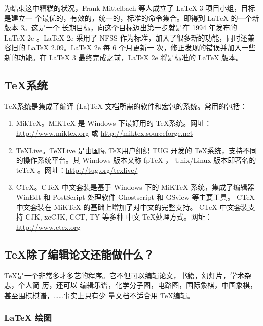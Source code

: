\documentclass[DIV=14,fontsize=11,headinclude=false,index=totoc,footinclude=false,headings=small]{tkz-doc}
\begin{document}
\begin{enumerate}
为结束这中糟糕的状况，Frank Mittelbach 等人成立了 \LaTeX{} 3 项目小组，目标是建立一
个最优的，有效的，统一的，标准的命令集合。即得到 \LaTeX{} 的一个新版本 3。这是一个
长期目标，向这个目标迈出第一步就是在 1994 年发布的 \LaTeX{} 2e 。\LaTeX{} 2e 采用了 NFSS
作为标准，加入了很多新的功能，同时还兼容旧的 \LaTeX{} 2.09。\LaTeX{} 2e 每 6 个月更新一
次，修正发现的错误并加入一些新的功能。在 \LaTeX{} 3 最终完成之前，\LaTeX{} 2e 将是标准的
\LaTeX{} 版本。

\end{enumerate}

\subsection{\TeX 系统}
\label{sec:texsystem}

\TeX 系统是集成了编译 (La)TeX 文档所需的软件和宏包的系统。常用的包括：

\begin{enumerate}
\item MikTeX。MiKTeX 是 Windows 下最好用的 \TeX 系统。网址：
  \url{http://www.miktex.org} 或 \url{http://miktex.sourceforge.net}
\item TeXLive。TeXLive 是由国际 \TeX 用户组织 TUG 开发的 \TeX 系统，支持不同的操作系统平台。其 Windows 版本又称 fpTeX ， Unix/Linux 版本即著名的 teTeX 。网址：\url{http://tug.org/texlive/}
\item CTeX。CTeX 中文套装是基于 Windows 下的 MiKTeX 系统，集成了编辑器 WinEdt 和
  PostScript 处理软件 Ghostscript 和 GSview 等主要工具。 CTeX 中文套装在 MiKTeX
  的基础上增加了对中文的完整支持。 CTeX 中文套装支持 CJK, xeCJK, CCT, TY 等多种
  中文 \TeX 处理方式。网址：\url{http://www.ctex.org}
\end{enumerate}

\subsection{\TeX 除了编辑论文还能做什么？}
\label{sec:other}

\TeX 是一个非常多才多艺的程序。它不但可以编辑论文，书籍，幻灯片，学术杂志，个人简
历，还可以
编辑乐谱，化学分子图，电路图，国际象棋，中国象棋，甚至围棋棋谱，……事实上只有少
量文档不适合用 \TeX 编辑。


\clearpage

\subsubsection{\LaTeX{} 绘图}
\label{sec:draw}
\end{document}
